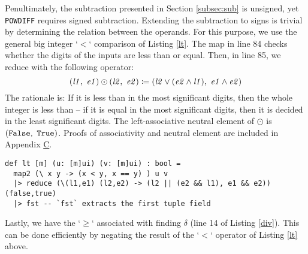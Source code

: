 Penultimately, the subtraction presented in Section \ref{subsec:sub} is
unsigned, yet \texttt{POWDIFF} requires signed subtraction. Extending the
subtraction to signs is trivial by determining the relation between the
operands. For this purpose, we use the general big integer `$<$` comparison of
Listing \ref{lt}. The map in line 84 checks whether the digits of the inputs are
less than or equal. Then, in line 85, we reduce with the following operator:
\begin{equation}
  \label{eq:lt}
  (\mathit{l1},~\mathit{e1}) \odot (\mathit{l2},~\mathit{e2}) \coloneq (\mathit{l2} \lor (\mathit{e2} \land \mathit{l1}),~\mathit{e1} \land \mathit{e2})
\end{equation}
The rationale is: If it is less than in the most significant digits, then the
whole integer is less than -- if it is equal in the most significant digits, then
it is decided in the least significant digits. The left-associative neutral
element of $\odot$ is $(\mathtt{False},~\mathtt{True})$. Proofs of associativity
and neutral element are included in Appendix \hyperref[app:C]{C}.

\begin{lstlisting}[language=futhark,caption={\footnotesize Futhark function to check $u < v$ in parallel for big ints $u$ and $v$ from file \texttt{helper.fut}.},label={lt},firstnumber=83]
def lt [m] (u: [m]ui) (v: [m]ui) : bool =
  map2 (\ x y -> (x < y, x == y) ) u v
  |> reduce (\(l1,e1) (l2,e2) -> (l2 || (e2 && l1), e1 && e2)) (false,true)
  |> fst -- `fst` extracts the first tuple field
\end{lstlisting}

Lastly, we have the `$\geq$` associated with finding $\delta$ (line 14 of Listing
\ref{div}). This can be done efficiently by negating the result of the `$<$`
operator of Listing \ref{lt} above.

